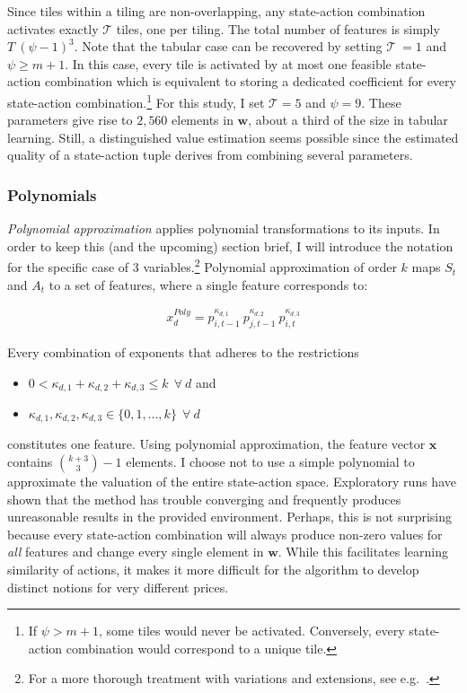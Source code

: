 Since tiles within a tiling are non-overlapping, any state-action combination activates exactly $\mathcal{T}$ tiles, one per tiling. The total number of features is simply $T~(\psi - 1)^3$. Note that the tabular case can be recovered by setting $\mathcal{T}~ = 1$ and $\psi \geq m + 1$. In this case, every tile is activated by at most one feasible state-action combination which is equivalent to storing a dedicated coefficient for every state-action combination.\footnote{If $\psi > m + 1$, some tiles would never be activated. Conversely, every state-action combination would correspond to a unique tile.} For this study, I set $\mathcal{T} = 5$ and $\psi = 9$. These parameters give rise to $2,560$ elements in $\boldsymbol{w}$, about a third of the size in tabular learning. Still, a distinguished value estimation seems possible since the estimated quality of a state-action tuple derives from combining several parameters. 


\subsubsection{Polynomials}\label{polynomial}

\emph{Polynomial approximation} applies polynomial transformations to its inputs. In order to keep this (and the upcoming) section brief, I will introduce the notation for the specific case of 3 variables.\footnote{For a more thorough treatment with variations and extensions, see e.g.\ \textcite{hastie_basis_2009}.} Polynomial approximation of order $k$ maps $S_t$ and $A_t$ to a set of features, where a single feature corresponds to:


\begin{gather}\label{polynomial_extraction}
x_d^{Poly} = p_{i, t-1}^{\kappa_{d,1}} ~ p_{j, t-1}^{\kappa_{d,2}} ~ p_{i, t}^{\kappa_{d,3}}
\end{gather}


Every combination of exponents that adheres to the restrictions

\begin{itemize}
	\item $0 < \kappa_{d,1} + \kappa_{d,2} + \kappa_{d,3} \leq k  ~~ \forall ~ d$ and
	\item $\kappa_{d,1}, \kappa_{d,2}, \kappa_{d,3} \in \{0, 1, ..., k\} ~~  \forall ~ d$
\end{itemize}

constitutes one feature. Using polynomial approximation, the feature vector $\boldsymbol{x}$ contains ${k + 3\choose3}  - 1$ elements. I choose not to use a simple polynomial to approximate the valuation of the entire state-action space. Exploratory runs have shown that the method has trouble converging and frequently produces unreasonable results in the provided environment. Perhaps, this is not surprising because every state-action combination will always produce non-zero values for \emph{all} features and change every single element in $\boldsymbol{w}$. While this facilitates learning similarity of actions, it makes it more difficult for the algorithm to develop distinct notions for very different prices.

